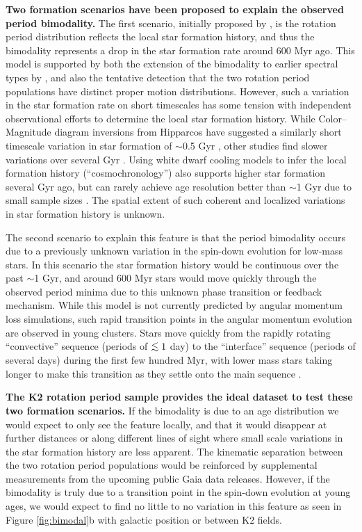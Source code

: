 \documentclass[12pt]{article}
\def\lesssim{\mathrel{\hbox{\rlap{\hbox{\lower3pt\hbox{$\sim$}}}\hbox{\raise2pt\hbox{$<$}}}}}
\begin{document}
{\bf Two formation scenarios have been proposed to explain the observed period bimodality.} The first scenario, initially proposed by \citet{mcquillan2013}, is the rotation period distribution reflects the local star formation history, and thus the bimodality represents a drop in the star formation rate around 600 Myr ago. This model is supported by both the extension of the bimodality to earlier spectral types by \citet{davenport2017}, and also the tentative detection that the two rotation period populations have distinct proper motion distributions. However, such a variation in the star formation rate on short timescales has some tension with independent observational efforts to determine the local star formation history. While Color--Magnitude diagram inversions from Hipparcos have suggested a similarly short timescale variation in star formation of  $\sim$0.5 Gyr \citep{hernandez2000}, other studies find slower variations over several Gyr \citep[e.g.][]{cignoni2006}. Using white dwarf cooling models to infer the local formation history (``cosmochronology'') also supports higher star formation several Gyr ago, but can rarely achieve age resolution better than $\sim$1 Gyr due to small sample sizes \citep{tremblay2014}. The spatial extent of such coherent and localized variations in star formation history is unknown.

The second scenario to explain this feature is that the period bimodality occurs due to a previously unknown variation in the spin-down evolution for low-mass stars. In this scenario the star formation history would be continuous over the past $\sim$1 Gyr, and around 600 Myr stars would move quickly through the observed period minima due to this unknown phase transition or feedback mechanism. While this model is not currently predicted by angular momentum loss simulations, such rapid transition points in the angular momentum evolution are observed in young clusters. Stars move quickly from the rapidly rotating ``convective'' sequence (periods of $\lesssim1$ day) to the ``interface'' sequence (periods of several days) during the first few hundred Myr, with lower mass stars taking longer to make this transition as they settle onto the main sequence \citep{barnes2003}.

{\bf The K2 rotation period sample provides the ideal dataset to test these two formation scenarios.} If the bimodality is due to an age distribution we would expect to only see the feature locally, and that it would disappear at further distances or along different lines of sight where small scale variations in the star formation history are less apparent. The kinematic separation between the two rotation period populations would be reinforced by supplemental measurements from the upcoming public Gaia data releases. However, if the bimodality is truly due to a transition point in the spin-down evolution at young ages, we would expect to find no little to no variation in this feature as seen in Figure \ref{fig:bimodal}b with galactic position or between K2 fields.
\end{document}
